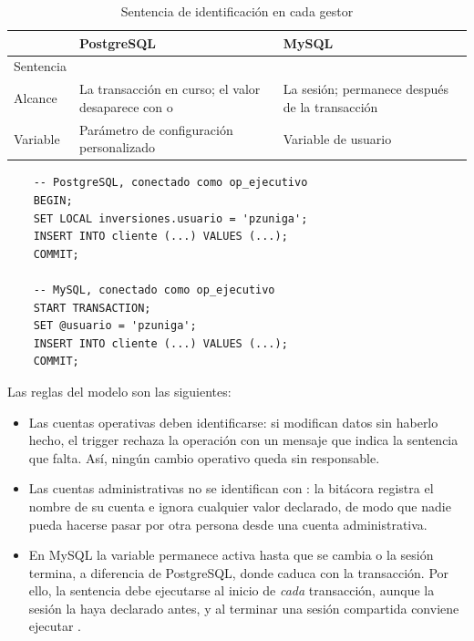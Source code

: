 \begin{table}[H]
	\centering
	\small
	\caption{Sentencia de identificaci\'on en cada gestor}
	\label{tab:identificacion}
	\begin{tabular}{@{}l L{5.2cm} L{6.2cm}@{}}
		\toprule
		& \textbf{PostgreSQL} & \textbf{MySQL} \\
		\midrule
		Sentencia &  &  \\
		Alcance & La transacci\'on en curso; el valor desaparece con  o  & La sesi\'on; permanece despu\'es de la transacci\'on \\
		Variable & Par\'ametro de configuraci\'on personalizado & Variable de usuario \\
		\bottomrule
	\end{tabular}
\end{table}

\begin{verbatim}
	-- PostgreSQL, conectado como op_ejecutivo
	BEGIN;
	SET LOCAL inversiones.usuario = 'pzuniga';
	INSERT INTO cliente (...) VALUES (...);
	COMMIT;

	-- MySQL, conectado como op_ejecutivo
	START TRANSACTION;
	SET @usuario = 'pzuniga';
	INSERT INTO cliente (...) VALUES (...);
	COMMIT;
\end{verbatim}

Las reglas del modelo son las siguientes:

\begin{itemize}
	\item Las cuentas operativas deben identificarse: si modifican datos sin haberlo hecho, el trigger rechaza la operaci\'on con un mensaje que indica la sentencia que falta. As\'i, ning\'un cambio operativo queda sin responsable.
	\item Las cuentas administrativas no se identifican con : la bit\'acora registra el nombre de su cuenta e ignora cualquier valor declarado, de modo que nadie pueda hacerse pasar por otra persona desde una cuenta administrativa.
	\item En MySQL la variable permanece activa hasta que se cambia o la sesi\'on termina, a diferencia de PostgreSQL, donde  caduca con la transacci\'on. Por ello, la sentencia debe ejecutarse al inicio de \emph{cada} transacci\'on, aunque la sesi\'on la haya declarado antes, y al terminar una sesi\'on compartida conviene ejecutar .
\end{itemize}


